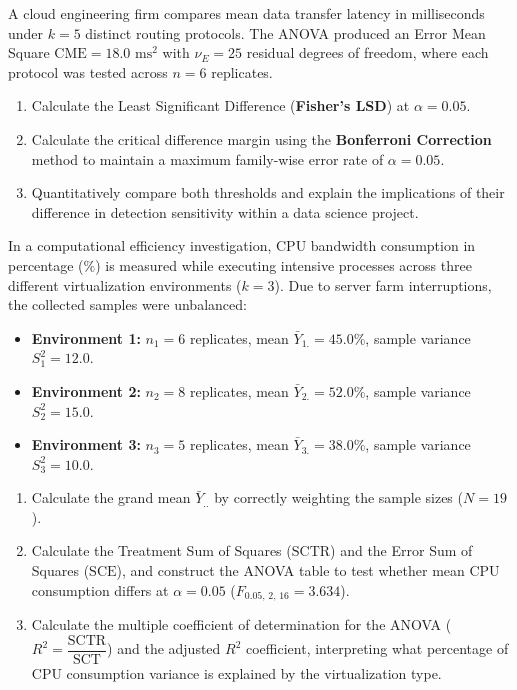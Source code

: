\begin{problema}
	\label{prob:bonferroni_lsd}
	A cloud engineering firm compares mean data transfer latency in milliseconds under $k = 5$ distinct routing protocols. The ANOVA produced an Error Mean Square $\text{CME} = 18.0$ $\text{ms}^2$ with $\nu_E = 25$ residual degrees of freedom, where each protocol was tested across $n = 6$ replicates.
	\begin{enumerate}
		\item Calculate the Least Significant Difference (\textbf{Fisher's LSD}) at $\alpha = 0.05$.
		\item Calculate the critical difference margin using the \textbf{Bonferroni Correction} method to maintain a maximum family-wise error rate of $\alpha = 0.05$.
		\item Quantitatively compare both thresholds and explain the implications of their difference in detection sensitivity within a data science project.
	\end{enumerate}
\end{problema}

\begin{problema}
	\label{prob:anova_oper_desbalanceado_r2}
	In a computational efficiency investigation, CPU bandwidth consumption in percentage ($\%$) is measured while executing intensive processes across three different virtualization environments ($k = 3$). Due to server farm interruptions, the collected samples were unbalanced:
	\begin{itemize}
		\item \textbf{Environment 1:} $n_1 = 6$ replicates, mean $\bar{Y}_{1.} = 45.0\%$, sample variance $S_1^2 = 12.0$.
		\item \textbf{Environment 2:} $n_2 = 8$ replicates, mean $\bar{Y}_{2.} = 52.0\%$, sample variance $S_2^2 = 15.0$.
		\item \textbf{Environment 3:} $n_3 = 5$ replicates, mean $\bar{Y}_{3.} = 38.0\%$, sample variance $S_3^2 = 10.0$.
	\end{itemize}
	\begin{enumerate}
		\item Calculate the grand mean $\bar{Y}_{..}$ by correctly weighting the sample sizes ($N = 19$).
		\item Calculate the Treatment Sum of Squares ($\text{SCTR}$) and the Error Sum of Squares ($\text{SCE}$), and construct the ANOVA table to test whether mean CPU consumption differs at $\alpha = 0.05$ ($F_{0.05, \, 2, \, 16} = 3.634$).
		\item Calculate the multiple coefficient of determination for the ANOVA ($R^2 = \dfrac{\text{SCTR}}{\text{SCT}}$) and the adjusted $R^2$ coefficient, interpreting what percentage of CPU consumption variance is explained by the virtualization type.
	\end{enumerate}
\end{problema}

